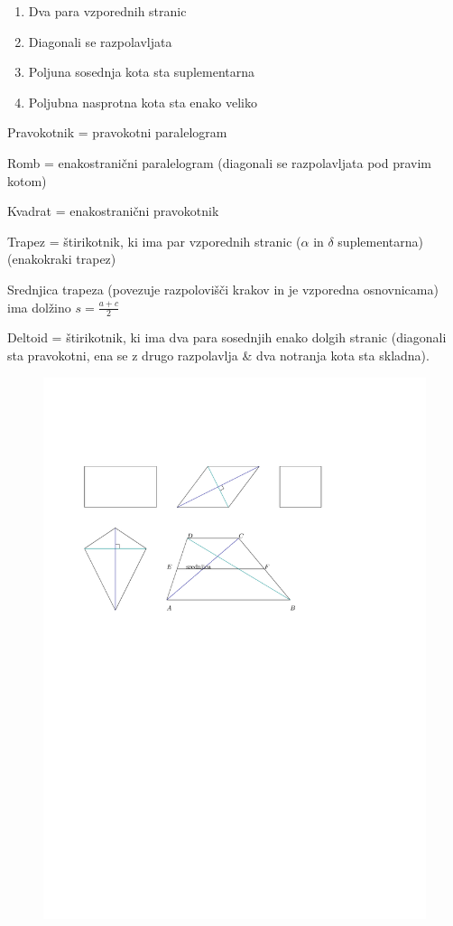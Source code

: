 \documentclass{article}
\begin{document}
\begin{enumerate}[i]
    \item Dva para vzporednih stranic
    \item Diagonali se razpolavljata
    \item Poljuna sosednja kota sta suplementarna
    \item Poljubna nasprotna kota sta enako veliko
  \end{enumerate}


Pravokotnik = pravokotni paralelogram

Romb = enakostranični paralelogram (diagonali se razpolavljata pod pravim kotom)

Kvadrat = enakostranični pravokotnik

Trapez = štirikotnik, ki ima par vzporednih stranic ($\alpha$ in $\delta$ suplementarna) (enakokraki trapez)

Srednjica trapeza (povezuje razpolovišči krakov in je vzporedna osnovnicama) ima dolžino $s=\frac{a+c}{2}$

Deltoid = štirikotnik, ki ima dva para sosednjih enako dolgih stranic (diagonali sta pravokotni, ena se z drugo razpolavlja \& dva notranja kota sta skladna).

\begin{figure}[H]
    \includegraphics[width=1\textwidth]{liki.pdf}
    \centering
\end{figure}
\end{document}
